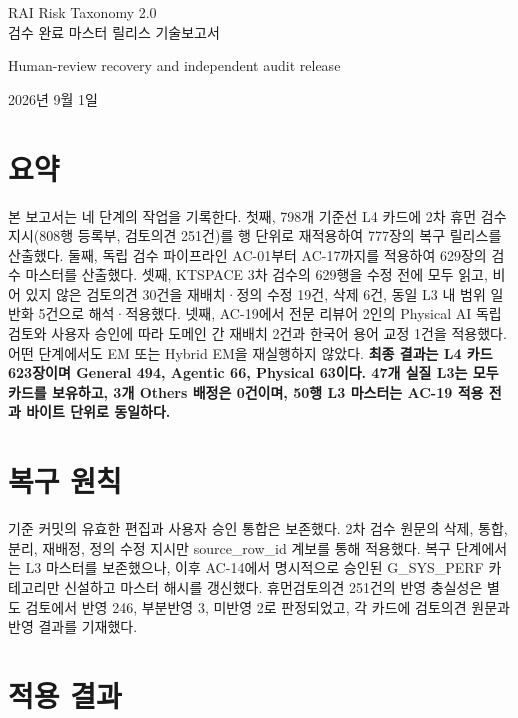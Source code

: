 \documentclass[11pt,a4paper]{article}
\begin{document}
\begin{titlepage}
\thispagestyle{empty}
\vspace*{42mm}
\begin{center}
{\LARGE RAI Risk Taxonomy 2.0\\[3pt]검수 완료 마스터 릴리스 기술보고서}\par
\vspace{9mm}
{\large Human-review recovery and independent audit release}\par
\vspace{6mm}
{\large 2026년 9월 1일}\par
\vspace{9mm}
\end{center}
\end{titlepage}
\par\section*{요약}
본 보고서는 네 단계의 작업을 기록한다. 첫째, 798개 기준선 L4 카드에 2차 휴먼 검수 지시(808행 등록부, 검토의견 251건)를 행 단위로 재적용하여 777장의 복구 릴리스를 산출했다. 둘째, 독립 검수 파이프라인 AC-01부터 AC-17까지를 적용하여 629장의 검수 마스터를 산출했다. 셋째, KTSPACE 3차 검수의 629행을 수정 전에 모두 읽고, 비어 있지 않은 검토의견 30건을 재배치·정의 수정 19건, 삭제 6건, 동일 L3 내 범위 일반화 5건으로 해석·적용했다. 넷째, AC-19에서 전문 리뷰어 2인의 Physical AI 독립 검토와 사용자 승인에 따라 도메인 간 재배치 2건과 한국어 용어 교정 1건을 적용했다. 어떤 단계에서도 EM 또는 Hybrid EM을 재실행하지 않았다. \textbf{최종 결과는 L4 카드 623장이며 General 494, Agentic 66, Physical 63이다. 47개 실질 L3는 모두 카드를 보유하고, 3개 Others 배정은 0건이며, 50행 L3 마스터는 AC-19 적용 전과 바이트 단위로 동일하다.}
\par\section{복구 원칙}
기준 커밋의 유효한 편집과 사용자 승인 통합은 보존했다. 2차 검수 원문의 삭제, 통합, 분리, 재배정, 정의 수정 지시만 source\_row\_id 계보를 통해 적용했다. 복구 단계에서는 L3 마스터를 보존했으나, 이후 AC-14에서 명시적으로 승인된 G\_SYS\_PERF 카테고리만 신설하고 마스터 해시를 갱신했다. 휴먼검토의견 251건의 반영 충실성은 별도 검토에서 반영 246, 부분반영 3, 미반영 2로 판정되었고, 각 카드에 검토의견 원문과 반영 결과를 기재했다.
\par\section{적용 결과}
\end{document}

